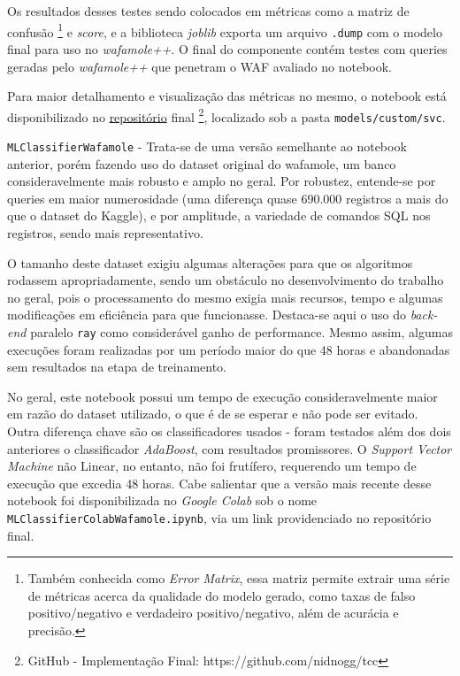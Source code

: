 \begin{alineas}
Os resultados desses testes sendo colocados em métricas como a matriz de confusão \footnote{Também conhecida como \textit{Error Matrix}, essa matriz permite extrair uma série de métricas acerca da qualidade do modelo gerado, como taxas de falso positivo/negativo e verdadeiro positivo/negativo, além de acurácia e precisão.} e \textit{score}, e a biblioteca \textit{joblib} exporta um arquivo \verb+.dump+ com o modelo final para uso no \textit{wafamole++}. O final do componente contém testes com queries geradas pelo \textit{wafamole++} que penetram o WAF avaliado no notebook.

Para maior detalhamento e visualização das métricas no mesmo, o notebook está disponibilizado no \href{https://github.com/nidnogg/tcc}{repositório} final \footnote{GitHub - Implementação Final: https://github.com/nidnogg/tcc}, localizado sob a pasta \verb+models/custom/svc+.

\item \verb+MLClassifierWafamole+ - Trata-se de uma versão semelhante ao notebook anterior, porém fazendo uso do dataset original do wafamole, um banco consideravelmente mais robusto e amplo no geral. Por robustez, entende-se por queries em maior numerosidade (uma diferença quase 690.000 registros a mais do que o dataset do Kaggle), e por amplitude, a variedade de comandos SQL nos registros, sendo mais representativo. 

O tamanho deste dataset exigiu algumas alterações para que os algoritmos rodassem apropriadamente, sendo um obstáculo no desenvolvimento do trabalho no geral, pois o processamento do mesmo exigia mais recursos, tempo e algumas modificações em eficiência para que funcionasse. Destaca-se aqui o uso do \textit{back-end} paralelo \verb+ray+ \cite{ray_backend_parallel} como considerável ganho de performance. Mesmo assim, algumas execuções foram realizadas por um período maior do que 48 horas e abandonadas sem resultados na etapa de treinamento.

No geral, este notebook possui um tempo de execução consideravelmente maior  em razão do dataset utilizado, o que é de se esperar e não pode ser evitado. Outra diferença chave são os classificadores usados - foram testados além dos dois anteriores o classificador \textit{AdaBoost}, com resultados promissores. O \textit{Support Vector Machine} não Linear, no entanto, não foi frutífero, requerendo um tempo de execução que excedia 48 horas. Cabe salientar que a versão mais recente desse notebook foi disponibilizada no \textit{Google Colab} sob o nome \verb+MLClassifierColabWafamole.ipynb+, via um link providenciado no repositório final.
\end{alineas}

